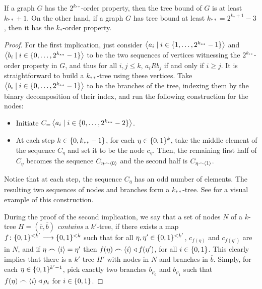         \begin{theorem} \label{thm:tree_implies_order}
            If a graph $G$ has the $2^{k_{**}}$-order property, then the tree bound of $G$ is at least $k_{**} + 1$.
            On the other hand, if a graph $G$ has tree bound at least $k_{**} = 2^{k_*+1}-3$, then it has the $k_*$-order
            property.
            \begin{proof}
                For the first implication, just consider $\left< a_i \mid i \in \{ 1, \dots, 2^{k_{**}}-1 \} \right>$ and
                $\left< b_i \mid i \in \{ 0, \dots, 2^{k_{**}}-1 \} \right>$ to be the two sequences of vertices witnessing the
                $2^{k_{**}}$-order property in $G$, and thus for all $i,j \leq k$, $a_i R b_j$ if and only if $i \geq j$.
                It is straightforward to build a $k_{**}$-tree using these vertices.
                Take $\left< b_i \mid i \in \{ 0, \dots, 2^{k_{**}}-1 \} \right>$ to be the branches of the tree, indexing them by
                the binary decomposition of their index, and run the following construction for the nodes:
                \begin{itemize}
                    \item Initiate $C_\empty = \Partriangle{a_i \mid i \in \parcurly{0, \dots, 2^{k_{**}}-2}}$.
                    \item At each step $k \in \{ 0, k_{**}-1 \}$, for each $\eta \in \{ 0,1 \}^k$, take the middle
                        element of the sequence $C_\eta$ and set it to be the node $c_\eta$.
                        Then, the remaining first half of $C_\eta$ becomes the sequence $C_{\eta \frown \left< 0 \right>}$
                        and the second half is $C_{\eta \frown \left< 1 \right>}$.
                \end{itemize}
                Notice that at each step, the sequence $C_\eta$ has an odd number of elements.
                The resulting two sequences of nodes and branches form a $k_{**}$-tree.
                See  for a visual example of this construction.

                During the proof of the second implication, we say that a set of nodes $N$ of a $k$-tree
                $H = (\overline{c},\overline{b})$ \emph{contains} a $k'$-tree, if there exists a map
                $f \colon \{ 0,1 \}^{<k'} \longrightarrow \{ 0,1 \}^{<k}$ such that for all $\eta, \eta' \in \{ 0,1 \}^{<k'}$,
                $c_{f(\eta)}$ and $c_{f(\eta')}$ are in $N$, and if $\eta \frown \left< i \right> = \eta'$ then
                $f(\eta) \frown \left< i \right> \triangleleft f(\eta')$, for all $i \in \{ 0, 1 \}$.
                This clearly implies that there is a $k'$-tree $H'$ with nodes in $N$ and branches in $\overline{b}$.
                Simply, for each $\eta \in \{ 0,1 \}^{k'-1}$, pick exactly two branches $b_{\rho_0}$ and $b_{\rho_1}$ such that
                $f(\eta)\frown\left< i \right> \triangleleft \rho_i$ for $i \in \{ 0,1 \}$.


\end{proof}
\end{theorem}
